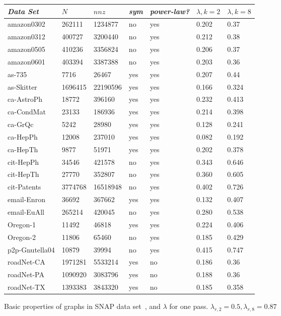 \begin{figure}
\caption{Basic properties of graphs in SNAP data set~\cite{Leskovec-data}, and $\lambda$ for one pass. $\lambda_{r,2}=0.5,\lambda_{r,8}=0.87$}
\centering
{ \begin{tabular}{ *7l }    \toprule
\label{table:big}
\emph{Data Set} & $N$ & $nnz$ & \emph{sym} & \emph{power-law?} & $\lambda, k=2$ & $\lambda, k=8$ \\\midrule 
amazon0302 & 262111 & 1234877 & no & yes & 0.202&0.37\\ 
amazon0312 & 400727 & 3200440 & no & yes & 0.212&0.38\\ 
amazon0505 & 410236 & 3356824 & no & yes & 0.206&0.37\\ 
amazon0601 & 403394 & 3387388 & no & yes & 0.203&0.36\\ 
as-735 & 7716 & 26467 & yes & yes & 0.207&0.44\\ 
as-Skitter & 1696415 & 22190596 & yes & yes & 0.166&0.324\\ 
ca-AstroPh & 18772 & 396160 & yes & yes & 0.232&0.413\\ 
ca-CondMat & 23133 & 186936 & yes & yes & 0.214&0.398\\ 
ca-GrQc & 5242 & 28980 & yes & yes & 0.128&0.241\\ 
ca-HepPh & 12008 & 237010 & yes & yes & 0.082&0.192\\ 
ca-HepTh & 9877 & 51971 & yes & yes & 0.202&0.378\\ 
cit-HepPh & 34546 & 421578 & no & yes & 0.343&0.646\\ 
cit-HepTh & 27770 & 352807 & no & yes & 0.360&0.605\\ 
cit-Patents & 3774768 & 16518948 & no & yes & 0.402&0.726\\ 
email-Enron & 36692 & 367662 & yes & yes & 0.132&0.407\\ 
email-EuAll & 265214 & 420045 & no & yes & 0.280&0.538\\ 
Oregon-1 & 11492 & 46818 & yes & yes & 0.224&0.406\\ 
Oregon-2 & 11806 & 65460 & no & yes & 0.185&0.429\\ 
p2p-Gnutella04 & 10879 & 39994 & no & yes & 0.415&0.747\\ 
roadNet-CA & 1971281 & 5533214 & yes & no & 0.186&0.36\\ 
roadNet-PA & 1090920 & 3083796 & yes & no & 0.188&0.36\\ 
roadNet-TX & 1393383 & 3843320 & yes & no & 0.185&0.358\\ 

\end{tabular}}
\end{figure}

